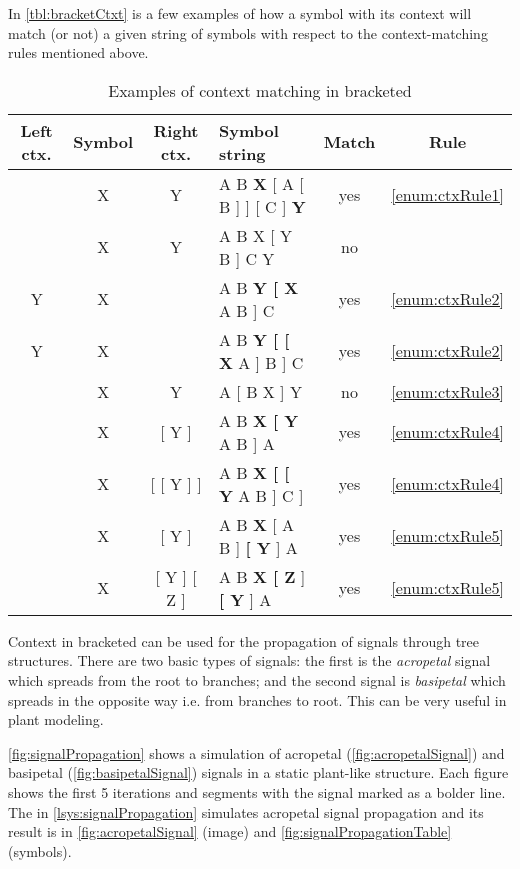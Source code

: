 In \autoref{tbl:bracketCtxt} is a few examples of how a symbol with its context will match (or not) a given string of symbols with respect to the context-matching rules mentioned above.
\begin{table}[h]
	\centering
	\begin{tabular}{c c c | p{128pt} c c}
   		\toprule
   		Left ctx. & Symbol & Right ctx. & Symbol string & Match & Rule\\
   		\midrule
		 & X & Y & A B {\btHL\bf X} [ A [ B ] ] [ C ] {\btHL\bf Y} & yes & \ref{enum:ctxRule1} \\
		 & X & Y & A B X [ Y B ] C Y & no &  \\
		 Y & X & & A B {\btHL\bf Y [ X} A B ] C & yes & \ref{enum:ctxRule2} \\
		 Y & X & & A B {\btHL\bf Y [ [ X} A ] B ] C & yes & \ref{enum:ctxRule2} \\
		 & X & Y & A [ B X ] Y & no & \ref{enum:ctxRule3} \\
		 & X & [ Y ] & A B {\btHL\bf X [ Y} A B ] A  & yes & \ref{enum:ctxRule4} \\
		 & X & [ [ Y ] ] & A B {\btHL\bf X [ [ Y} A B ] C ] & yes & \ref{enum:ctxRule4} \\
		 & X & [ Y ] & A B {\btHL\bf X} [ A B ] {\btHL\bf{}[ Y} ] A  & yes & \ref{enum:ctxRule5} \\
		 & X & [ Y ] [ Z ] & A B {\btHL\bf X [ Z} ] {\btHL\bf{}[ Y} ] A  & yes & \ref{enum:ctxRule5} \\
		\bottomrule
	\end{tabular}
	\caption{Examples of context matching in bracketed \lsystems}
	\label{tbl:bracketCtxt}
\end{table}

Context in bracketed \lsystems can be used for the propagation of signals through tree structures.
There are two basic types of signals: the first is the \emph{acropetal} signal which spreads from the root to branches; and the second signal is \emph{basipetal} which spreads in the opposite way i.e. from branches to root.
This can be very useful in plant modeling.

\autoref{fig:signalPropagation} shows a simulation of acropetal (\ref{fig:acropetalSignal}) and basipetal (\ref{fig:basipetalSignal}) signals in a static plant-like structure.
Each figure shows the first 5 iterations and segments with the signal marked as a bolder line.
The \lsystem in \autoref{lsys:signalPropagation} simulates acropetal signal propagation and its result is in \autoref{fig:acropetalSignal} (image) and \autoref{fig:signalPropagationTable} (symbols).

